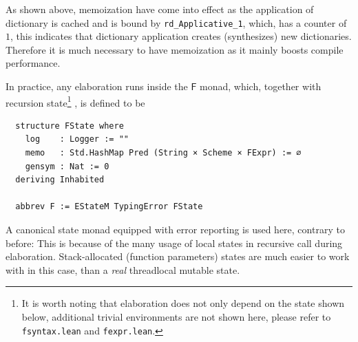 \documentclass[a4paper, 11pt]{article}
\theoremstyle{remark}\newtheorem*{remark}{Remark}
\theoremstyle{definition}\newtheorem*{definition}{Definition}
\begin{document}
As shown above, memoization have come into effect as the application of dictionary is cached and is bound by
\texttt{rd\_Applicative\_1}, which, has a counter of $1$, this indicates that dictionary application creates
(synthesizes) new dictionaries.
Therefore it is much necessary to have memoization as it mainly boosts compile performance.

In practice, any elaboration runs inside the $\mathsf{F}$ monad,
which, together with recursion state\footnote{
It is worth noting that elaboration does not only depend on the state shown below,
additional trivial environments are not shown here, please refer to \texttt{fsyntax.lean} and
\texttt{fexpr.lean}.
}
, is defined to be
\begin{verbatim}
  structure FState where
    log    : Logger := ""
    memo   : Std.HashMap Pred (String × Scheme × FExpr) := ∅
    gensym : Nat := 0
  deriving Inhabited

  abbrev F := EStateM TypingError FState
\end{verbatim}

A canonical state monad equipped with error reporting is used here, contrary to before: This is because
of the many usage of local states in recursive call during elaboration. Stack-allocated (function parameters)
states are much easier to work with in this case, than a \emph{real} threadlocal mutable state.
\end{document}
